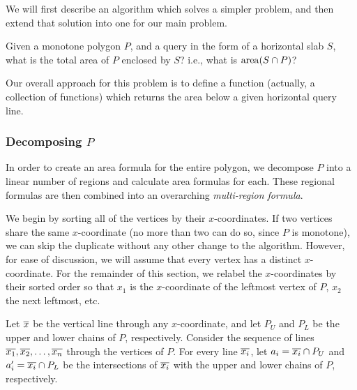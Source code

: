 We will first describe an algorithm which solves a simpler problem, and then 
extend that solution into one for our main problem.

\begin{problem}
Given a monotone polygon $P$, and a query in the form of a horizontal slab $S$, 
what is the total area of $P$ enclosed by $S$?  i.e., what is $\operatorname{area}\!\left(S \cap P\right)$?
\end{problem}

Our overall approach for this problem is to define a function (actually, a 
collection of functions) which returns the area below a given horizontal query 
line. 

\subsubsection{Decomposing $P$}
\label{sec:decompose}

In order to create an area formula for the entire polygon, we decompose $P$ into 
a linear number of regions and calculate area formulas for each. These regional 
formulas are then combined into an overarching \emph{multi-region formula}.

We begin by sorting all of the vertices by their $x$-coordinates. 
If two vertices share the same $x$-coordinate (no more than two can do so, since 
$P$ is monotone), we can skip the duplicate without any other change to the 
algorithm. 
However, for ease of discussion, we will assume that every vertex has a distinct 
$x$-coordinate.
For the remainder of this section, we relabel the $x$-coordinates by their 
sorted order so that $x_1$ is the $x$-coordinate of the leftmost vertex of $P$, 
$x_2$ the next leftmost, etc.

Let $\overline{x}$ be the vertical line through any $x$-coordinate, and let $P_U$ 
and $P_L$ be the upper and lower chains of $P$, respectively. Consider the 
sequence of lines $\overline{x_1}, \overline{x_2}, \ldots, \overline{x_n}$ through the 
vertices of $P$.
For every line $\overline{x_i}$, let $a_i = \overline{x_i} \cap P_U$ and $a_i' = 
\overline{x_i} \cap P_L$ be the intersections of $\overline{x_i}$ with the upper and 
lower chains of $P$, respectively.

